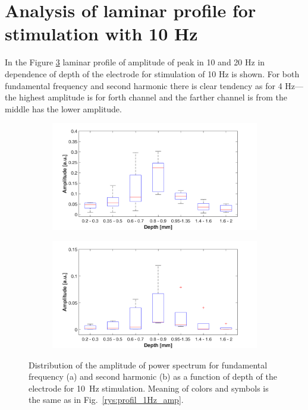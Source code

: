 \documentclass{pracalicmgr}
\begin{document}
\section{Analysis of laminar profile for stimulation with 10 Hz}  

In the Figure \ref{rys:profil_10Hz_wid} laminar profile of amplitude of peak in 10 and 20 Hz in dependence of depth of the electrode for stimulation of 10 Hz is shown. For both fundamental frequency and second harmonic there is clear tendency as for 4 Hz--- the highest amplitude is for forth channel and the farther channel is from the middle has the lower amplitude.

   	\begin{figure}[H]
	\begin{subfigure}{.5\textwidth}
		\centering
		\includegraphics[width=1.\linewidth]{profile_10Hz_wid.png}
		\caption{}
		\label{rys:profil_10Hz_wid1}
	\end{subfigure}%
	\begin{subfigure}{.5\textwidth}
		\centering
		\includegraphics[width=1.\linewidth]{profile_10Hz_wid2.png}
		\caption{}
		\label{rys:profil_10Hz_wid2}
	\end{subfigure}
	\caption{Distribution of the amplitude of power spectrum for fundamental frequency (a) and second harmonic (b) as a function of depth of the electrode for 10~Hz stimulation. Meaning of colors and symbols is the same as in Fig.~\ref{rys:profil_1Hz_amp}.}
	\label{rys:profil_10Hz_wid}
\end{figure}
\end{document}
